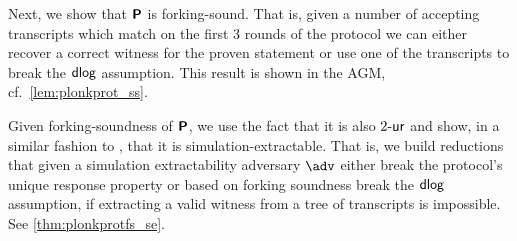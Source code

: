 \documentclass[runningheads,11pt]{llncs}
\begin{document}
Next, we show that $\bm{\mathsf{P}}$ is forking-sound. That is, given a
number of accepting transcripts which match on the first 3 rounds of the
protocol we can either recover a correct witness for the proven statement or use
one of the transcripts to break the $\mathsf{dlog}$ assumption. This result is shown in
the AGM, cf.~\cref{lem:plonkprot_ss}.

Given forking-soundness of $\bm{\mathsf{P}}$, we use the fact that it is also
${2\text{-}\mathsf{ur}}$ and show, in a similar fashion to \cite{INDOCRYPT:FKMV12}, that it is
simulation-extractable. That is, we build reductions that given a simulation
extractability adversary $\advse$ either break the protocol's unique response
property or based on forking soundness break the $\mathsf{dlog}$ assumption, if extracting a valid witness from a
tree of transcripts is impossible. See \cref{thm:plonkprotfs_se}.


  
\end{document}
